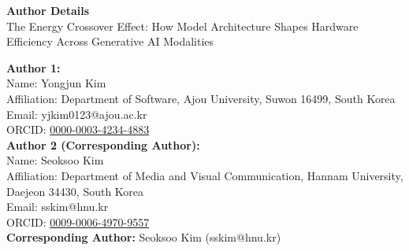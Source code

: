 \documentclass[12pt]{article}
\begin{document}
\thispagestyle{empty}

\begin{center}
{\LARGE\bfseries Author Details}\\[2em]

{\Large The Energy Crossover Effect: How Model Architecture Shapes Hardware Efficiency Across Generative AI Modalities}\\[3em]
\end{center}

\noindent\textbf{Author 1:}\\
Name: Yongjun Kim\\
Affiliation: Department of Software, Ajou University, Suwon 16499, South Korea\\
Email: yjkim0123@ajou.ac.kr\\
ORCID: \href{https://orcid.org/0000-0003-4234-4883}{0000-0003-4234-4883}\\[2em]

\noindent\textbf{Author 2 (Corresponding Author):}\\
Name: Seoksoo Kim\\
Affiliation: Department of Media and Visual Communication, Hannam University, Daejeon 34430, South Korea\\
Email: sskim@hnu.kr\\
ORCID: \href{https://orcid.org/0009-0006-4970-9557}{0009-0006-4970-9557}\\[3em]

\noindent\textbf{Corresponding Author:} Seoksoo Kim (sskim@hnu.kr)
\end{document}

